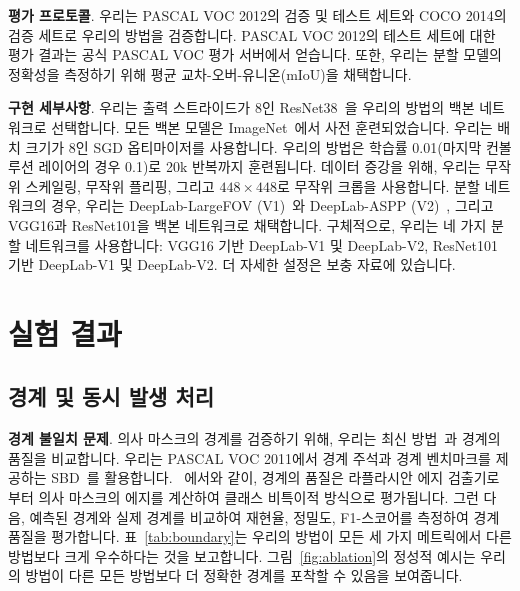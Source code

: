 \documentclass[final]{cvpr}
\begin{document}
\vspace{0.5mm}
\noindent
\textbf{평가 프로토콜}. 우리는 PASCAL VOC 2012의 검증 및 테스트 세트와 COCO 2014의 검증 세트로 우리의 방법을 검증합니다. PASCAL VOC 2012의 테스트 세트에 대한 평가 결과는 공식 PASCAL VOC 평가 서버에서 얻습니다. 또한, 우리는 분할 모델의 정확성을 측정하기 위해 평균 교차-오버-유니온(mIoU)을 채택합니다.

\vspace{0.5mm}
\noindent
\textbf{구현 세부사항}. 우리는 출력 스트라이드가 8인 ResNet38~\cite{wu2019wider}을 우리의 방법의 백본 네트워크로 선택합니다. 모든 백본 모델은 ImageNet~\cite{deng2009imagenet}에서 사전 훈련되었습니다. 우리는 배치 크기가 8인 SGD 옵티마이저를 사용합니다. 우리의 방법은 학습률 0.01(마지막 컨볼루션 레이어의 경우 0.1)로 20k 반복까지 훈련됩니다. 데이터 증강을 위해, 우리는 무작위 스케일링, 무작위 플리핑, 그리고 $448 \times 448$로 무작위 크롭을 사용합니다. 분할 네트워크의 경우, 우리는 DeepLab-LargeFOV (V1)~\cite{chen2014semantic}와 DeepLab-ASPP (V2)~\cite{chen2017deeplab}, 그리고 VGG16과 ResNet101을 백본 네트워크로 채택합니다. 구체적으로, 우리는 네 가지 분할 네트워크를 사용합니다: VGG16 기반 DeepLab-V1 및 DeepLab-V2, ResNet101 기반 DeepLab-V1 및 DeepLab-V2. 더 자세한 설정은 보충 자료에 있습니다.

\section{실험 결과}

\subsection{경계 및 동시 발생 처리}\label{section:5.1}

\noindent\textbf{경계 불일치 문제}. 의사 마스크의 경계를 검증하기 위해, 우리는 최신 방법~\cite{chen2020boundary, wang2020self, zhou2016learning}과 경계의 품질을 비교합니다. 우리는 PASCAL VOC 2011에서 경계 주석과 경계 벤치마크를 제공하는 SBD~\cite{hariharan2011semantic}를 활용합니다. ~\cite{chen2020boundary}에서와 같이, 경계의 품질은 라플라시안 에지 검출기로부터 의사 마스크의 에지를 계산하여 클래스 비특이적 방식으로 평가됩니다. 그런 다음, 예측된 경계와 실제 경계를 비교하여 재현율, 정밀도, F1-스코어를 측정하여 경계 품질을 평가합니다. 표~\ref{tab:boundary}는 우리의 방법이 모든 세 가지 메트릭에서 다른 방법보다 크게 우수하다는 것을 보고합니다. 그림~\ref{fig:ablation}의 정성적 예시는 우리의 방법이 다른 모든 방법보다 더 정확한 경계를 포착할 수 있음을 보여줍니다.



\end{document}
